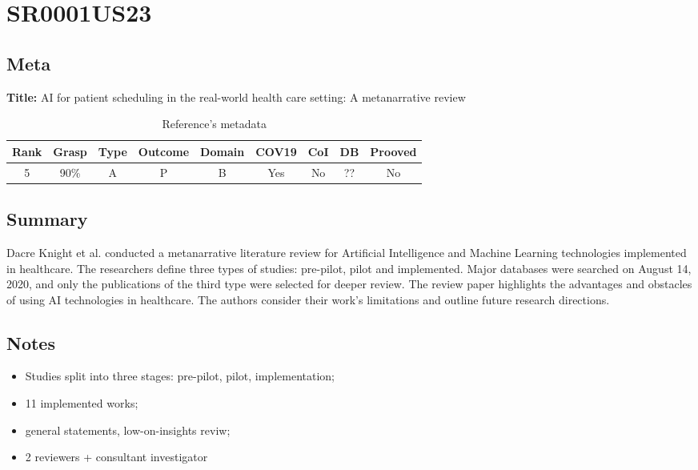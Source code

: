 \section{ SR0001US23 }


\subsection{Meta}

    \textbf{Title:}
    AI for patient scheduling in the real-world health care setting: A metanarrative review

    \begin{table}[H]
        \centering
        \begin{tabular}{|c|c|c|c|c|c|c|c|c|}
            \hline
                \textbf{Rank} & \textbf{Grasp} & \textbf{Type} & \textbf{Outcome} & \textbf{Domain} & \textbf{COV19} & \textbf{CoI} & \textbf{DB} & \textbf{Prooved} \\
            \hline
                5 & 90\% & A & P & B & Yes & No & ?? & No \\
            \hline
        \end{tabular}
        \caption{Reference's metadata}
        \label{tab:SR0001US23}
    \end{table}

\subsection{Summary}
    Dacre Knight et al. \cite{x034} conducted a metanarrative literature review for Artificial Intelligence and Machine Learning technologies implemented in healthcare. The researchers define three types of studies: pre-pilot, pilot and implemented. Major databases were searched on August 14, 2020, and only the publications of the third type were selected for deeper review. The review paper highlights the advantages and obstacles of using AI technologies in healthcare. The authors consider their work's limitations and outline future research directions. 

\subsection{Notes}
    \begin{itemize}
        \item Studies split into three stages: pre-pilot, pilot, implementation;
        \item 11 implemented works;
        \item general statements, low-on-insights reviw;
        \item 2 reviewers + consultant investigator
    \end{itemize}


